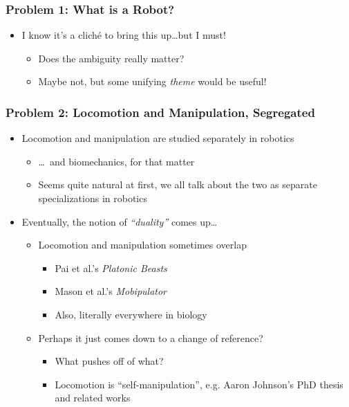 \documentclass[aspectratio=169]{beamer}
\begin{document}
		\begin{frame}
			\frametitle{Problem 1: What is a Robot?}
			\begin{itemize}
				\item I know it's a cliché to bring this up\dots \pause but I must! \pause
				\begin{itemize}
					\item Does the ambiguity really matter? \pause
					\item Maybe not, but some unifying \emph{theme} would be useful!
				\end{itemize}
			\end{itemize}
		\end{frame}
	
		\begin{frame}
			
		\end{frame}
	
		\begin{frame}
			\frametitle{Problem 2: Locomotion and Manipulation, Segregated}
			\begin{itemize}
				\item Locomotion and manipulation are studied separately in robotics\pause
					\begin{itemize}
						\item \dots~and biomechanics, for that matter
						\item Seems quite natural at first, we all talk about the two as separate specializations in robotics
					\end{itemize}\pause
				\item Eventually, the notion of \emph{``duality''} comes up\dots
				\begin{itemize}\pause
					\item Locomotion and manipulation sometimes overlap
						\begin{itemize}
							\item Pai et al.'s \emph{Platonic Beasts} \autocite{pai1994platonic}
							\item Mason et al.'s \emph{Mobipulator} \autocite{MasonMobileManipulator1999} \autocite{MasonDesktopMobileManipulators2000}
							\item Also, literally everywhere in biology
						\end{itemize}
					\item Perhaps it just comes down to a change of reference?
						\begin{itemize}
							\item What pushes off of what?
							\item Locomotion is ``self-manipulation'', e.g. Aaron Johnson's PhD thesis \autocite{johnson2014self} and related works \autocite{johnson2012standing}\autocite{johnson2016hybrid}
						\end{itemize}
				\end{itemize}
			\end{itemize}
		\end{frame}
	
\end{document}
